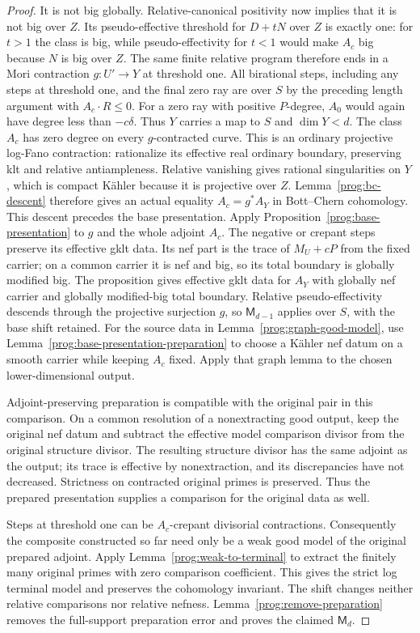 \begin{proof}
It is not big globally. Relative-canonical positivity now implies
that it is not big over $Z$. Its pseudo-effective threshold for
$D+tN$ over $Z$ is exactly one: for $t>1$ the class is big, while
pseudo-effectivity for $t<1$ would make $A_c$ big because $N$ is
big over $Z$. The same finite relative program therefore ends in
a Mori contraction $g:U'\to Y$ at threshold one.
All birational steps, including any steps at threshold one, and
the final zero ray are over $S$ by the preceding length argument
with $A_c\cdot R\leq0$. For a zero ray with positive $P$-degree,
$A_0$ would again have degree less than $-c\delta$.
Thus $Y$ carries a map to $S$ and $\dim Y<d$.
The class $A_c$ has zero degree on every $g$-contracted curve.
This is an ordinary projective log-Fano contraction: rationalize its
effective real ordinary boundary, preserving klt and relative
antiampleness. Relative vanishing gives rational singularities on
$Y$, which is compact K\"ahler because it is projective over $Z$.
Lemma~\ref{prog:bc-descent} therefore gives an actual equality
$A_c=g^*A_Y$ in Bott--Chern cohomology. This descent precedes the
base presentation. Apply Proposition~\ref{prog:base-presentation}
to $g$ and the whole adjoint $A_c$. The negative or crepant steps
preserve its effective gklt data. Its nef part is the trace of
$M_U+cP$ from the fixed carrier; on a common carrier it is nef and
big, so its total boundary is globally modified big. The proposition
gives effective gklt data for $A_Y$ with globally nef carrier and
globally modified-big total boundary. Relative pseudo-effectivity
descends through the projective surjection $g$, so $\mathsf M_{d-1}$
applies over $S$, with the base shift retained. For the source data in
Lemma~\ref{prog:graph-good-model}, use
Lemma~\ref{prog:base-presentation-preparation} to choose a K\"ahler
nef datum on a smooth carrier while keeping $A_c$ fixed. Apply that
graph lemma to the chosen lower-dimensional output.

Adjoint-preserving preparation is compatible with the original pair
in this comparison. On a common resolution of a nonextracting good
output, keep the original nef datum and subtract the effective model
comparison divisor from the original structure divisor. The resulting
structure divisor has the same adjoint as the output; its trace is
effective by nonextraction, and its discrepancies have not decreased.
Strictness on contracted original primes is preserved. Thus the
prepared presentation supplies a comparison for the original data as
well.

Steps at threshold one can be $A_c$-crepant divisorial contractions.
Consequently the composite constructed so far need only be a weak
good model of the original prepared adjoint. Apply
Lemma~\ref{prog:weak-to-terminal} to extract the finitely many original
primes with zero comparison coefficient. This gives the strict log
terminal model and preserves the cohomology invariant. The shift
changes neither relative comparisons nor relative nefness.
Lemma~\ref{prog:remove-preparation} removes the full-support
preparation error and proves the claimed $\mathsf M_d$.
\end{proof}

